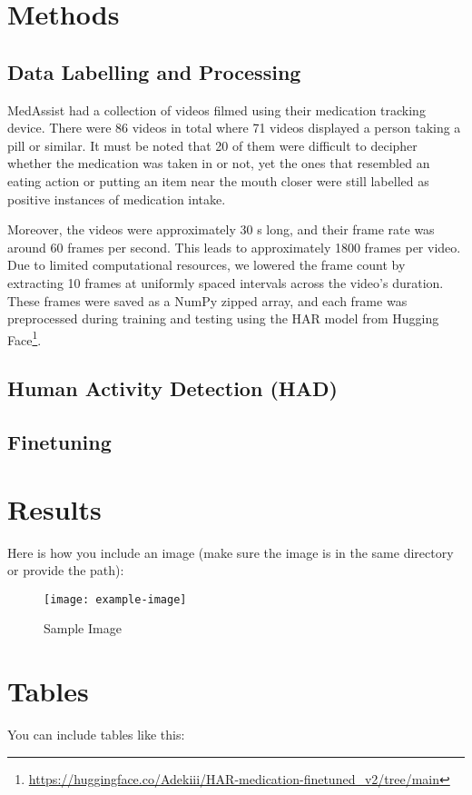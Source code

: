 \documentclass[a4paper,12pt]{article}
\begin{document}
\section{Methods}

\subsection{Data Labelling and Processing}
MedAssist had a collection of videos filmed using their medication tracking device. There were 86 videos in total where 71 videos displayed a person taking a pill or similar. It must be noted that 20 of them were difficult to decipher whether the medication was taken in or not, yet the ones that resembled an eating action or putting an item near the mouth closer were still labelled as positive instances of medication intake. 

Moreover, the videos were approximately 30 s long, and their frame rate was around 60 frames per second. This leads to approximately 1800 frames per video. Due to limited computational resources, we lowered the frame count by extracting 10 frames at uniformly spaced intervals across the video's duration. These frames were saved as a NumPy zipped array, and each frame was preprocessed during training and testing using the HAR model from Hugging Face\footnote{\url{https://huggingface.co/Adekiii/HAR-medication-finetuned_v2/tree/main}}.
\subsection{Human Activity Detection (HAD)}
\subsection{Finetuning}

\section{Results}
Here is how you include an image (make sure the image is in the same directory or provide the path):

\begin{figure}[H]
    \centering
    \texttt{[image: example-image]} %
    \caption{Sample Image}
    \label{fig:sample-image}
\end{figure}

\section{Tables}
You can include tables like this:
\end{document}

